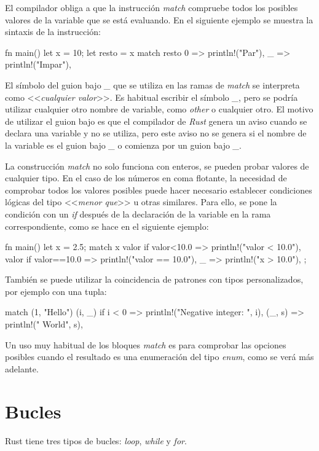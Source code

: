 El compilador obliga a que la instrucción \textit{match} compruebe todos los posibles valores de la variable que se está evaluando. En el siguiente ejemplo se muestra la sintaxis de la instrucción:

\begin{Codigo}
fn main() {
   let x = 10;
   let resto = x%
   match resto {
      0 => println!("Par"),
      _ => println!("Impar"),
   }
}
\end{Codigo}

El símbolo del guion bajo \textit{\_} que se utiliza en las ramas de \textit{match} se interpreta como <<\textit{cualquier valor}>>. Es habitual escribir el símbolo \textit{\_}, pero se podría utilizar cualquier otro nombre de variable, como \textit{other} o cualquier otro. El motivo de utilizar el guion bajo es que el compilador de \textit{Rust} genera un aviso cuando se declara una variable y no se utiliza, pero este aviso no se genera si el nombre de la variable es el guion bajo \textit{\_} o comienza por un guion bajo \textit{\_}.

La construcción \textit{match} no solo funciona con enteros, se pueden probar valores de cualquier tipo. En el caso de los números en coma flotante, la necesidad de comprobar todos los valores posibles puede hacer necesario establecer condiciones lógicas del tipo <<\textit{menor que}>> u otras similares. Para ello, se pone la condición con un \textit{if} después de la declaración de la variable en la rama correspondiente, como se hace en el siguiente ejemplo:

\begin{Codigo}
fn main() {
   let x = 2.5;
   match x {
      valor if valor<10.0 => println!("{valor} < 10.0"),
      valor if valor==10.0 => println!("{valor} == 10.0"),
      _ => println!("{x} > 10.0"),
   };
}
\end{Codigo}

También se puede utilizar la coincidencia de patrones con tipos personalizados, por ejemplo con una tupla:

\begin{Codigo}
match (1, "Hello") {
   (i, _) if i < 0 => println!("Negative integer: {}", i),
   (_, s) => println!("{} World", s),
}
\end{Codigo}

Un uso muy habitual de los bloques \textit{match} es para comprobar las opciones posibles cuando el resultado es una enumeración del tipo \textit{enum}, como se verá más adelante.
 
\section{Bucles}
\label{sec_bucles}
\noindent Rust tiene tres tipos de bucles: \textit{loop}, \textit{while} y \textit{for}.

